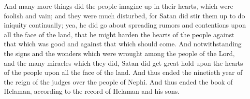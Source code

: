 \bverse \iffalse And many more things did the people imagine up in their hearts, which were foolish and vain; and they were much disturbed, for Satan did stir them up to do iniquity continually; yea, he did go about spreading rumors and contentions upon all the face of the land, that he might harden the hearts of the people against that which was good and against that which should come. \fi
And many more things did the people imagine up in their hearts, which were foolish and vain; and they were much disturbed, for Satan did stir them up to do iniquity continually; yea, he did go about spreading rumors and contentions upon all the face of the land, that he might harden the hearts of the people against that which was good and against that which should come.
\bverse \iffalse And notwithstanding the signs and the wonders which were wrought among the people of the Lord, and the many miracles which they did, Satan did get great hold upon the hearts of the people upon all the face of the land. \fi
And notwithstanding the signs and the wonders which were wrought among the people of the Lord, and the many miracles which they did, Satan did get great hold upon the hearts of the people upon all the face of the land.
\bverse \iffalse And thus ended the ninetieth year of the reign of the judges over the people of Nephi. \fi
And thus ended the ninetieth year of the reign of the judges over the people of Nephi.
\bverse \iffalse And thus ended the book of Helaman, according to the record of Helaman and his sons. \fi
And thus ended the book of Helaman, according to the record of Helaman and his sons.



